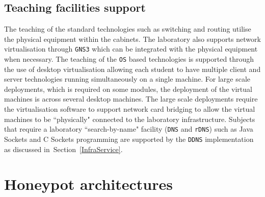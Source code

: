 \subsection{Teaching facilities support}
The teaching of the standard technologies such as switching and routing utilise the physical equipment within the cabinets. The laboratory also supports network virtualisation through \texttt{GNS3} which can be integrated with the physical equipment when necessary. The teaching of the \texttt{OS} based technologies is supported through the use of desktop virtualisation allowing each student to have multiple client and server technologies running simultaneously on a single machine. For large scale deployments, which is required on some modules, the deployment of the virtual machines is across several desktop machines. The large scale deployments require the virtualisation software to support network card bridging to allow the virtual machines to be ``physically" connected to the laboratory infrastructure. Subjects that require a laboratory ``search-by-name" facility (\texttt{DNS} and \texttt{rDNS}) such as Java Sockets and C Sockets programming are supported by the \texttt{DDNS} implementation as discussed in~Section~\ref{InfraService}.

\section{Honeypot architectures}

